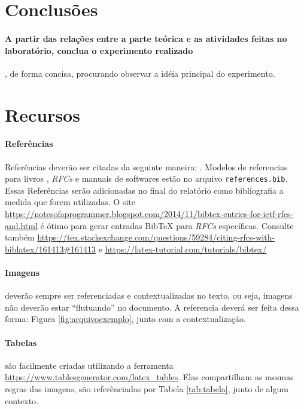 \documentclass[10pt, a4paper]{article}
\begin{document}
    \section{Conclusões}

    \paragraph{A partir das relações entre a parte teórica e as atividades feitas no laboratório, conclua o experimento realizado}, de forma concisa, procurando observar a idéia principal do experimento.

    
    \section{Recursos}
    
    \paragraph{Referências}
    Referências deverão ser citadas da seguinte maneira: \cite{kurose_ross_2022}. Modelos de referencias para livros \cite{kurose_ross_2022}, \textit{RFCs} \cite{RFC0791} e manuais de softwares \cite{ping} estão no arquivo \texttt{references.bib}. Essas Referências serão adicionadas no final do relatório como bibliografia a medida que forem utilizadas. O site \url{https://notesofaprogrammer.blogspot.com/2014/11/bibtex-entries-for-ietf-rfcs-and.html} é ótimo para gerar entradas BibTeX para \textit{RFCs} específicas. Consulte também \url{https://tex.stackexchange.com/questions/59284/citing-rfcs-with-biblatex/161413#161413} e \url{https://latex-tutorial.com/tutorials/bibtex/}

    

    \paragraph{Imagens} deverão sempre ser referenciadas e contextualizadas no texto, ou seja, imagens não deverão estar ``flutuando'' no documento. A referencia deverá ser feita dessa forma: Figura \ref{fig:arquivoexemplo}, junto com a contextualização.

    \paragraph{Tabelas} são facilmente criadas utilizando a ferramenta \url{https://www.tablesgenerator.com/latex_tables}. Elas compartilham as mesmas regras das imagens, são referênciadas por Tabela \ref{tab:tabela}, junto de algum contexto.
\end{document}
